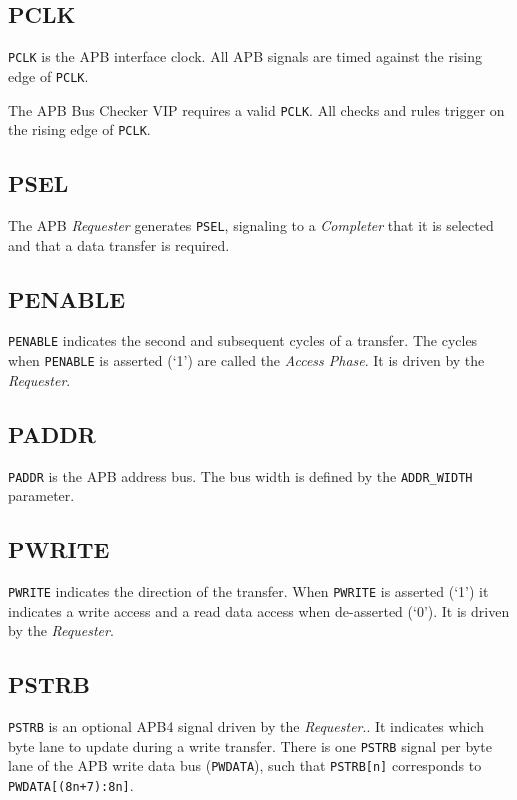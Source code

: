 \subsection{PCLK}\label{pclk}

\texttt{PCLK} is the APB interface clock. All APB signals are timed against the rising edge of \texttt{PCLK}.

The APB Bus Checker VIP requires a valid \texttt{PCLK}. All checks and rules trigger on the rising edge of \texttt{PCLK}.

\subsection{PSEL}\label{psel}

The APB \emph{Requester} generates \texttt{PSEL}, signaling to a \emph{Completer} that it is selected and that a data transfer is required.

\subsection{PENABLE}\label{penable}

\texttt{PENABLE} indicates the second and subsequent cycles of a transfer. The cycles when \texttt{PENABLE} is asserted (`1') are called the \emph{Access Phase}. It is driven by the \emph{Requester}.

\subsection{PADDR}\label{paddr}

\texttt{PADDR} is the APB address bus. The bus width is defined by the \texttt{ADDR\_WIDTH} parameter.

\subsection{PWRITE}\label{pwrite}

\texttt{PWRITE} indicates the direction of the transfer. When \texttt{PWRITE} is asserted (`1') it indicates a write access and a read data access when de-asserted (`0'). It is driven by the \emph{Requester}.

\subsection{PSTRB}\label{pstrb}

\texttt{PSTRB} is an optional APB4 signal driven by the \emph{Requester}.. It indicates which byte lane to update during a
write transfer. There is one \texttt{PSTRB} signal per byte lane of the APB write data bus
(\texttt{PWDATA}), such that \texttt{PSTRB[n]} corresponds to \texttt{PWDATA[(8n+7):8n]}.


